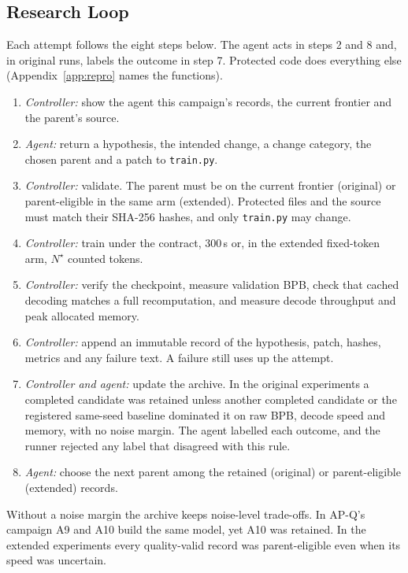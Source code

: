 \documentclass{article}
\newif\ifshowhumanmarkers \showhumanmarkersfalse
\newcommand{\humantag}[1]{{\color{humanframe}\sffamily\scriptsize\bfseries HUMAN AUTHOR MUST REWRITE/VERIFY [#1]}\ }
\newcommand{\humanauthor}[2][]{\ifshowhumanmarkers\begin{humanbox}\humantag{#1}#2\end{humanbox}\else #2\par\fi}
\begin{document}
\subsection{Research Loop}\label{sec:loop}
\humanauthor[P2-04 r6]{Each attempt follows the eight steps below. The agent acts in steps 2 and 8 and, in original runs, labels the outcome in step 7. Protected code does everything else (Appendix~\ref{app:repro} names the functions).
{\small\begin{enumerate}\setlength{\itemsep}{0pt}\setlength{\parskip}{0pt}\setlength{\topsep}{2pt}
\item \emph{Controller:} show the agent this campaign's records, the current frontier and the parent's source.
\item \emph{Agent:} return a hypothesis, the intended change, a change category, the chosen parent and a patch to \texttt{train.py}.
\item \emph{Controller:} validate. The parent must be on the current frontier (original) or parent-eligible in the same arm (extended). Protected files and the source must match their SHA-256 hashes, and only \texttt{train.py} may change.
\item \emph{Controller:} train under the contract, 300\,s or, in the extended fixed-token arm, $N^\star$ counted tokens.
\item \emph{Controller:} verify the checkpoint, measure validation BPB, check that cached decoding matches a full recomputation, and measure decode throughput and peak allocated memory.
\item \emph{Controller:} append an immutable record of the hypothesis, patch, hashes, metrics and any failure text. A failure still uses up the attempt.
\item \emph{Controller and agent:} update the archive. In the original experiments a completed candidate was retained unless another completed candidate or the registered same-seed baseline dominated it on raw BPB, decode speed and memory, with no noise margin. The agent labelled each outcome, and the runner rejected any label that disagreed with this rule.
\item \emph{Agent:} choose the next parent among the retained (original) or parent-eligible (extended) records.
\end{enumerate}}
Without a noise margin the archive keeps noise-level trade-offs. In AP-Q's campaign A9 and A10 build the same model, yet A10 was retained. In the extended experiments every quality-valid record was parent-eligible even when its speed was uncertain.}
\end{document}
